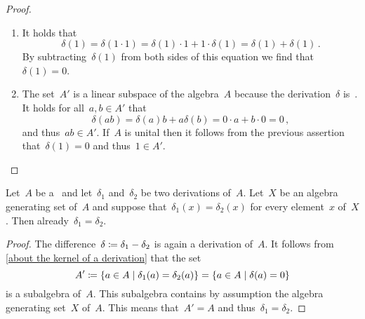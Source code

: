 \begin{proof}
  \leavevmode
  \begin{enumerate}
    \item
      It holds that
      \[
        \delta(1)
        =
        \delta(1 \cdot 1)
        =
        \delta(1) \cdot 1 + 1 \cdot \delta(1)
        =
        \delta(1) + \delta(1) \,.
      \]
      By subtracting~$\delta(1)$ from both sides of this equation we find that~$\delta(1) = 0$.
    \item
      The set~$A'$ is a linear subspace of the algebra~$A$ because the derivation~$\delta$ is~\linear{$\kf$}.
      It holds for all~$a, b \in A'$ that
      \[
        \delta(ab)
        =
        \delta(a) b + a \delta(b)
        =
        0 \cdot a + b \cdot 0
        =
        0 \,,
      \]
      and thus~$ab \in A'$.
      If~$A$ is unital then it follows from the previous assertion that~$\delta(1) = 0$ and thus~$1 \in A'$.
    \qedhere
  \end{enumerate}
\end{proof}


\begin{proposition}
  \label{dervation is uniquely determined by algebra generators}
  Let~$A$ be a~\algebra{$\kf$} and let~$\delta_1$ and~$\delta_2$ be two derivations of~$A$.
  Let~$X$ be an algebra generating set of~$A$ and suppose that~$\delta_1(x) = \delta_2(x)$ for every element~$x$ of~$X$.
  Then already~$\delta_1 = \delta_2$.
\end{proposition}


\begin{proof}
  The difference~$\delta \coloneqq \delta_1 - \delta_2$ is again a derivation of~$A$.
  It follows from \cref{about the kernel of a derivation} that the set
  \[
    A'
    \defined
    \{
      a \in A
    \suchthat
      \delta_1(a) = \delta_2(a)
    \}
    =
    \{
      a \in A
    \suchthat
      \delta(a) = 0
    \}
  \]
  is a subalgebra of~$A$.
  This subalgebra contains by assumption the algebra generating set~$X$ of~$A$.
  This means that~$A' = A$ and thus~$\delta_1 = \delta_2$.
\end{proof}


